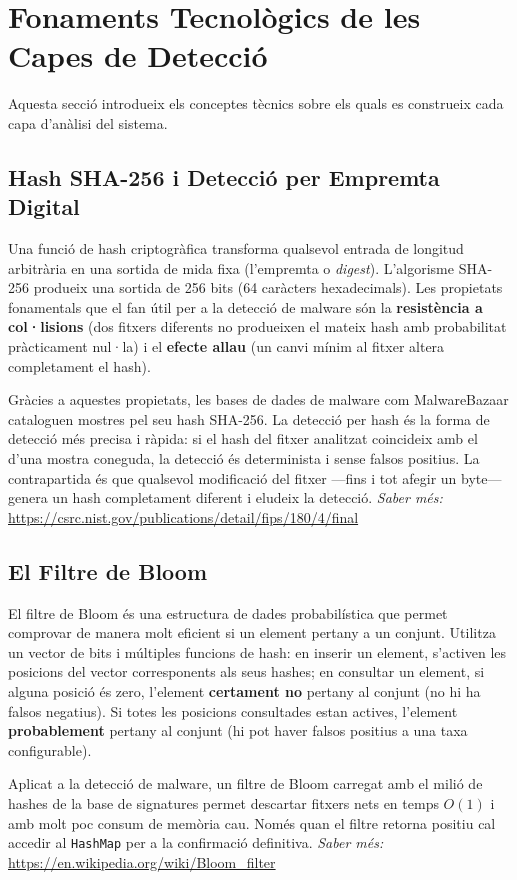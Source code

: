 \documentclass[12pt,a4paper]{report}
\begin{document}
\section{Fonaments Tecnològics de les Capes de Detecció}
Aquesta secció introdueix els conceptes tècnics sobre els quals es construeix cada capa d'anàlisi del sistema.

\subsection{Hash SHA-256 i Detecció per Empremta Digital}
Una funció de hash criptogràfica transforma qualsevol entrada de longitud arbitrària en una sortida de mida fixa (l'empremta o \textit{digest}). L'algorisme SHA-256 produeix una sortida de 256 bits (64 caràcters hexadecimals). Les propietats fonamentals que el fan útil per a la detecció de malware són la \textbf{resistència a col·lisions} (dos fitxers diferents no produeixen el mateix hash amb probabilitat pràcticament nul·la) i el \textbf{efecte allau} (un canvi mínim al fitxer altera completament el hash).

Gràcies a aquestes propietats, les bases de dades de malware com MalwareBazaar cataloguen mostres pel seu hash SHA-256. La detecció per hash és la forma de detecció més precisa i ràpida: si el hash del fitxer analitzat coincideix amb el d'una mostra coneguda, la detecció és determinista i sense falsos positius. La contrapartida és que qualsevol modificació del fitxer ---fins i tot afegir un byte--- genera un hash completament diferent i eludeix la detecció.
\textit{Saber més:} \url{https://csrc.nist.gov/publications/detail/fips/180/4/final}

\subsection{El Filtre de Bloom}
El filtre de Bloom és una estructura de dades probabilística que permet comprovar de manera molt eficient si un element pertany a un conjunt. Utilitza un vector de bits i múltiples funcions de hash: en inserir un element, s'activen les posicions del vector corresponents als seus hashes; en consultar un element, si alguna posició és zero, l'element \textbf{certament no} pertany al conjunt (no hi ha falsos negatius). Si totes les posicions consultades estan actives, l'element \textbf{probablement} pertany al conjunt (hi pot haver falsos positius a una taxa configurable).

Aplicat a la detecció de malware, un filtre de Bloom carregat amb el milió de hashes de la base de signatures permet descartar fitxers nets en temps $O(1)$ i amb molt poc consum de memòria cau. Només quan el filtre retorna positiu cal accedir al \texttt{HashMap} per a la confirmació definitiva.
\textit{Saber més:} \url{https://en.wikipedia.org/wiki/Bloom_filter}
\end{document}
